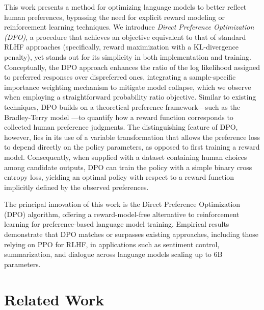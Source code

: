 This work presents a method for optimizing language models to better reflect human preferences, bypassing the need for explicit reward modeling or reinforcement learning techniques. We introduce \textit{{Direct Preference Optimization} (DPO)}, a procedure that achieves an objective equivalent to that of standard RLHF approaches (specifically, reward maximization with a KL-divergence penalty), yet stands out for its simplicity in both implementation and training. Conceptually, the DPO approach enhances the ratio of the log likelihood assigned to preferred responses over dispreferred ones, integrating a sample-specific importance weighting mechanism to mitigate model collapse, which we observe when employing a straightforward probability ratio objective. Similar to existing techniques, DPO builds on a theoretical preference framework—such as the Bradley-Terry model \cite{bradley1952rankanalysis}—to quantify how a reward function corresponds to collected human preference judgments. The distinguishing feature of DPO, however, lies in its use of a variable transformation that allows the preference loss to depend directly on the policy parameters, as opposed to first training a reward model. Consequently, when supplied with a dataset containing human choices among candidate outputs, DPO can train the policy with a simple binary cross entropy loss, yielding an optimal policy with respect to a reward function implicitly defined by the observed preferences.

The principal innovation of this work is the Direct Preference Optimization (DPO) algorithm, offering a reward-model-free alternative to reinforcement learning for preference-based language model training. Empirical results demonstrate that DPO matches or surpasses existing approaches, including those relying on PPO for RLHF, in applications such as sentiment control, summarization, and dialogue across language models scaling up to 6B parameters.

\section{Related Work}

